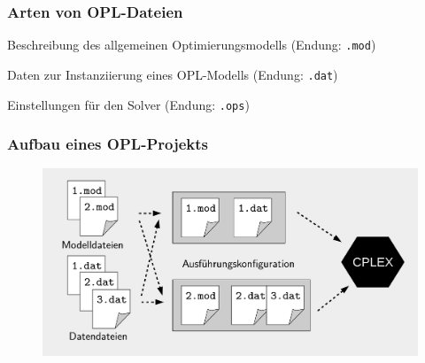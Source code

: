 \begin{frame}
 \frametitle{Arten von OPL-Dateien}
 \begin{description}
  \item<1-2>[Modelldateien] Beschreibung des allgemeinen Optimierungsmodells (Endung: \texttt{.mod})
  \item<1-2>[Datendateien] Daten zur Instanziierung eines OPL-Modells (Endung: \texttt{.dat})
  \item<1-1>[Einstellungsdateien] Einstellungen für den Solver (Endung: \texttt{.ops})
 \end{description}
\end{frame}

\begin{frame}
 \frametitle{Aufbau eines OPL-Projekts}
 \begin{figure}
  \centering
  \includegraphics[width=\linewidth]{Bilder/OPL-Aufbau}
 \end{figure}
\end{frame}

